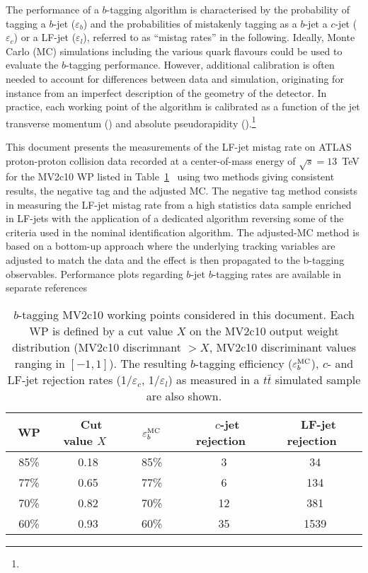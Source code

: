 The performance of a $b$-tagging algorithm is characterised by the probability of tagging a $b$-jet ($\varepsilon_b$) and the probabilities of mistakenly tagging as a $b$-jet a $c$-jet ($\varepsilon_c$) or a LF-jet ($\varepsilon_l$), referred to as ``mistag rates'' in the following. Ideally, Monte Carlo (MC) simulations including the various quark flavours could be used to evaluate the $b$-tagging performance. However, additional calibration is often needed to account for differences between data and simulation, originating for instance from an imperfect description of the geometry of the detector. In practice, each working point of the algorithm is calibrated as a function of the jet transverse momentum (\ptjet) and absolute pseudorapidity (\aetajet).\footnote{\AtlasCoordFootnote}

This document presents the measurements of the LF-jet mistag rate on ATLAS proton-proton collision data recorded at a center-of-mass energy of $\sqrt{s}=13$~TeV for the MV2c10 WP listed in Table~\ref{tab:wp}~\cite{this_work} using two methods giving consistent results, the negative tag and the adjusted MC. The negative tag method consists in measuring the LF-jet mistag rate from a high statistics data sample enriched in LF-jets with the application of a dedicated algorithm reversing some of the criteria used in the nominal identification algorithm. The adjusted-MC method is based on a bottom-up approach where the underlying tracking variables are adjusted to match the data and the effect is then propagated to the b-tagging observables. Performance plots regarding $b$-jet $b$-tagging rates are available in separate references~\cite{}



\begin{table}[htb]
  \setlength\extrarowheight{3pt}
  \caption{$b$-tagging MV2c10 working points considered in this document. Each WP is defined by a cut value $X$ on the MV2c10 output weight distribution (MV2c10 discrimnant $> X$, MV2c10 discriminant values ranging in $[-1,1]$). The resulting $b$-tagging efficiency ($\varepsilon^{\textrm{MC}}_b$), $c$- and LF-jet rejection rates (1/$\varepsilon_c$, 1/$\varepsilon_l$) as measured in a $t\bar{t}$ simulated sample are also shown.}
  \begin{center}
      \begin{tabular}{|c|c | c | cc|}
      \hline
      ~WP~ & ~Cut value $X$~ & ~~$\varepsilon^{\textrm{MC}}_b$~~ & ~$c$-jet rejection~ & ~LF-jet rejection~ \\[3.5pt]
      \hline
      85\% &     0.18  &     85\%   & 3   & 34 \\
      77\% &     0.65  &     77\%   & 6   & 134 \\
      70\% &     0.82  &     70\%   & 12  & 381 \\
      60\% &     0.93  &     60\%   & 35  & 1539 \\
      \hline
  \end{tabular}
  \end{center}
\label{tab:wp}
\end{table}


